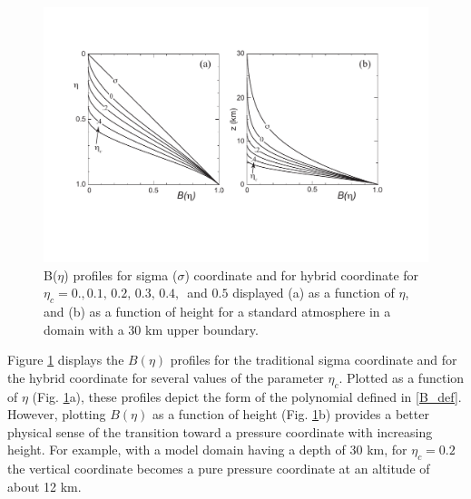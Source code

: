\begin{figure}
\centerline{\includegraphics[width=38pc]{figures/B_profile.pdf}}
\caption{\label{figure:B_profile}B($\eta$) profiles for sigma ($\sigma$) coordinate and for hybrid coordinate for $\eta_c=0.,0.1,\,0.2,\,0.3,\,0.4,\,$ and $0.5$ displayed (a) as a function of $\eta$, and (b) as a function of height for a standard atmosphere in a domain with a 30 km upper boundary.}
\end{figure}

Figure \ref{figure:B_profile} displays the $B(\eta)$ profiles for the traditional sigma coordinate and for the hybrid coordinate for several values of the parameter $\eta_c$. Plotted as a function of $\eta$ (Fig. \ref{figure:B_profile}a), these profiles depict the form of the polynomial defined in \eqref{B_def}. However, plotting $B(\eta)$ as a function of height  (Fig. \ref{figure:B_profile}b) provides a better physical sense of the transition toward a pressure coordinate with increasing height. For example, with a model domain having a depth of 30 km, for $\eta_c=0.2$ the vertical coordinate becomes a pure pressure coordinate at an altitude of about 12 km.

